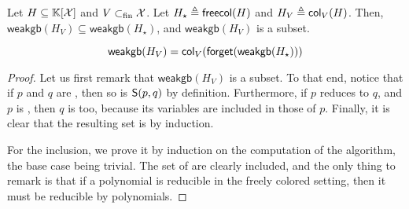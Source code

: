 \begin{lemma}
  \label{lem:weakgb-color-compatible}
  Let $H \subseteq \mathbb{K}[\mathcal{X}]$
  and $V \subset_{\text{fin}} \mathcal{X}$.
  Let $H_\star \triangleq \mathop{\mathsf{freecol}}(H)$
  and $H_V \triangleq \mathop{\mathsf{col}_{V}}(H)$.
  Then, 
  $\mathsf{weakgb}(H_V) \subseteq 
  \mathsf{weakgb}(H_\star)$,
  and $\mathsf{weakgb}(H_V)$ is 
  a  subset.

  \begin{equation*}
   \mathsf{weakgb}(H_V)
   =
   \mathop{\mathsf{col}_{V}}(\mathop{\mathsf{forget}}(\mathsf{weakgb}(H_\star)))
  \end{equation*}
\end{lemma}
\begin{proof}
  Let us first remark that 
  $\mathsf{weakgb}(H_V)$ is 
  a  subset. To that end,
  notice that if $p$ and $q$ are ,
  then so is $\mathsf{S}(p,q)$ by definition.
  Furthermore,
  if $p$ reduces to $q$, and $p$ is ,
  then $q$ is too, because its variables are included in
  those of $p$. Finally, it is clear that 
  the resulting set is
   by induction.

  For the inclusion, 
  we prove it by induction on the computation of the algorithm,
  the base case being trivial. 
  The set of  are clearly included,
  and the only thing to remark is that 
  if a  polynomial is reducible
  in the freely colored setting, then it must be reducible
  by  polynomials. 
\end{proof}

